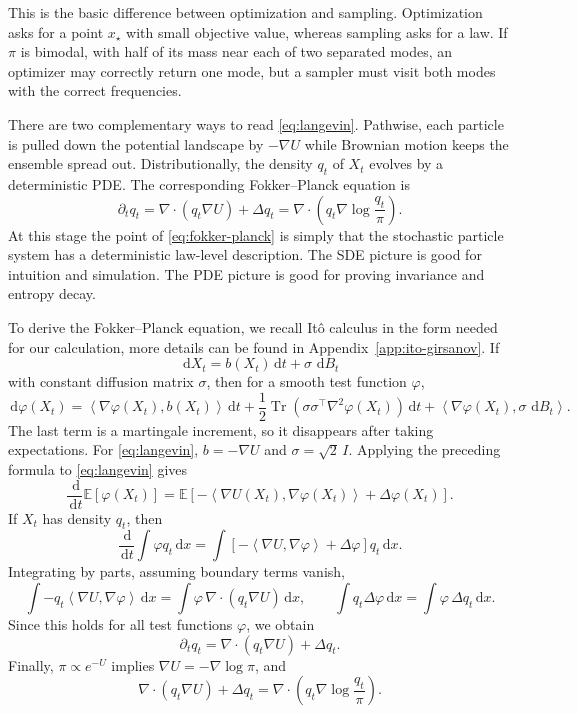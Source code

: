 \documentclass{amsart}
\numberwithin{equation}{section}
\theoremstyle{plain}
\theoremstyle{definition}
\theoremstyle{remark}
\DeclareMathOperator{\Tr}{Tr}
\newcommand{\E}{\mathbb{E}}
\newcommand{\dd}{\,\mathrm{d}}
\newcommand{\Id}{I}
\newcommand{\ip}[2]{\left\langle #1,#2 \right\rangle}
\begin{document}
This is the basic difference between optimization and sampling.  Optimization
asks for a point $x_\star$ with small objective value, whereas sampling asks for
a law.  If $\pi$ is bimodal, with half of its mass near each of two separated
modes, an optimizer may correctly return one mode, but a sampler must visit both
modes with the correct frequencies.

There are two complementary ways to read \eqref{eq:langevin}.  Pathwise, each
particle is pulled down the potential landscape by $-\nabla U$ while Brownian
motion keeps the ensemble spread out.  Distributionally, the density $q_t$ of
$X_t$ evolves by a deterministic PDE\@.  The corresponding Fokker--Planck
equation is
\begin{equation}\label{eq:fokker-planck}
    \partial_t q_t
    = \nabla\cdot(q_t\nabla U)+\Delta q_t
    = \nabla\cdot\!\left(q_t\nabla\log\frac{q_t}{\pi}\right).
\end{equation}
At this stage the point of \eqref{eq:fokker-planck} is simply that the
stochastic particle system has a deterministic law-level description.  The SDE
picture is good for intuition and simulation.  The PDE picture is good for
proving invariance and entropy decay.

To derive the Fokker--Planck equation, we recall It\^o calculus in the form needed for our
calculation, more details can be found in Appendix~\ref{app:ito-girsanov}.  If
\[
    \dd X_t=b(X_t)\dd t+\sigma\,\dd B_t
\]
with constant diffusion matrix $\sigma$, then for a smooth test function
$\varphi$,
\[
    \dd \varphi(X_t)
    =
    \ip{\nabla\varphi(X_t)}{b(X_t)}\dd t
    +\frac12\Tr\!\left(\sigma\sigma^\top\nabla^2\varphi(X_t)\right)\dd t
    +\ip{\nabla\varphi(X_t)}{\sigma\,\dd B_t}.
\]
The last term is a martingale increment, so it disappears after taking
expectations.  For \eqref{eq:langevin}, $b=-\nabla U$ and
$\sigma=\sqrt2\,\Id$.
Applying the preceding formula to
\eqref{eq:langevin} gives
\[
    \frac{\dd}{\dd t}\E[\varphi(X_t)]
    =
    \E[-\ip{\nabla U(X_t)}{\nabla\varphi(X_t)}+\Delta\varphi(X_t)].
\]
If $X_t$ has density $q_t$, then
\[
    \frac{\dd}{\dd t}\int \varphi q_t\dd x
    =
    \int\left[-\ip{\nabla U}{\nabla\varphi}+\Delta\varphi\right]q_t\dd x.
\]
Integrating by parts, assuming boundary terms vanish,
\[
    \int -q_t\ip{\nabla U}{\nabla\varphi}\dd x
    =
    \int \varphi\,\nabla\cdot(q_t\nabla U)\dd x,
    \qquad
    \int q_t\Delta\varphi\dd x
    =
    \int \varphi\,\Delta q_t\dd x.
\]
Since this holds for all test functions $\varphi$, we obtain
\[
    \partial_tq_t=\nabla\cdot(q_t\nabla U)+\Delta q_t.
\]
Finally, $\pi\propto e^{-U}$ implies $\nabla U=-\nabla\log\pi$, and
\[
    \nabla\cdot(q_t\nabla U)+\Delta q_t
    =
    \nabla\cdot\left(q_t\nabla\log\frac{q_t}{\pi}\right).
\]
\end{document}
